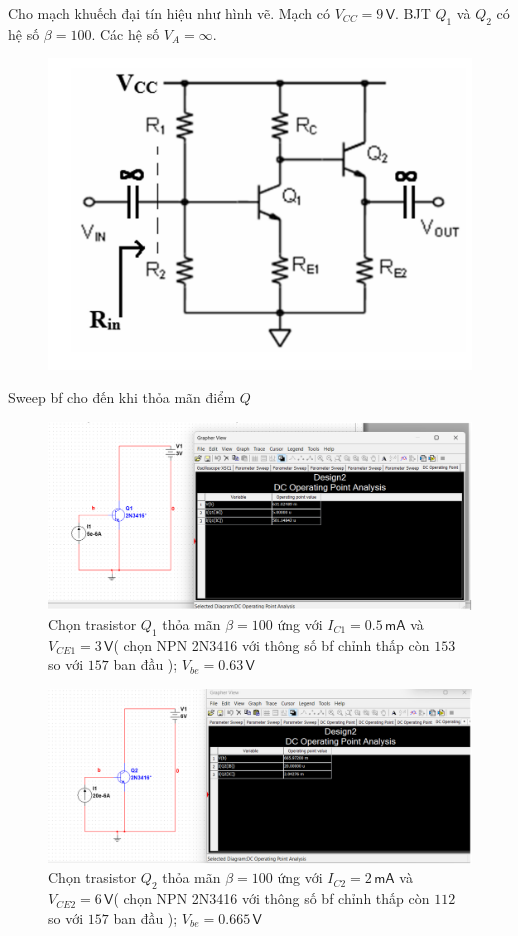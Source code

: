 
Cho mạch khuếch đại tín hiệu như hình vẽ. Mạch có $V_{CC}=9\,\textsf{V}$. BJT $Q_{1}$ và $Q_{2}$ có hệ số $\beta = 100$. Các hệ số $V_{A} = \infty$.

\begin{figure}[H]
	\centering
	\includegraphics[width=.7\linewidth]{./my-chapters/my-images/Question9/debai.png}
\end{figure}


Sweep bf cho đến khi thỏa mãn điểm $Q$
	
	\begin{figure}[H]
		\centering
		\includegraphics[width=.8\linewidth]{./my-chapters/my-images/Question9/a_sweep_timq.png}
		\caption{Chọn trasistor $Q_{1}$ thỏa mãn $\beta = 100$ ứng với $I_{C1} = 0.5 \,\textsf{mA}$ và $V_{CE1} = 3\,\textsf{V}$( chọn NPN 2N3416 với thông số bf chỉnh thấp còn $153$ so với $157$ ban đầu ); $V_{be} = 0.63 \,\textsf{V}$}
	\end{figure}
	
	\begin{figure}[H]
		\centering
		\includegraphics[width=.8\linewidth]{./my-chapters/my-images/Question9/a_sweep_timq_2.png}
		\caption{Chọn trasistor $Q_{2}$ thỏa mãn $\beta = 100$ ứng với $I_{C2} = 2 \,\textsf{mA}$ và $V_{CE2} = 6\,\textsf{V}$( chọn NPN 2N3416 với thông số bf chỉnh thấp còn $112$ so với $157$ ban đầu ); $V_{be} = 0.665 \,\textsf{V}$}
	\end{figure}
	
